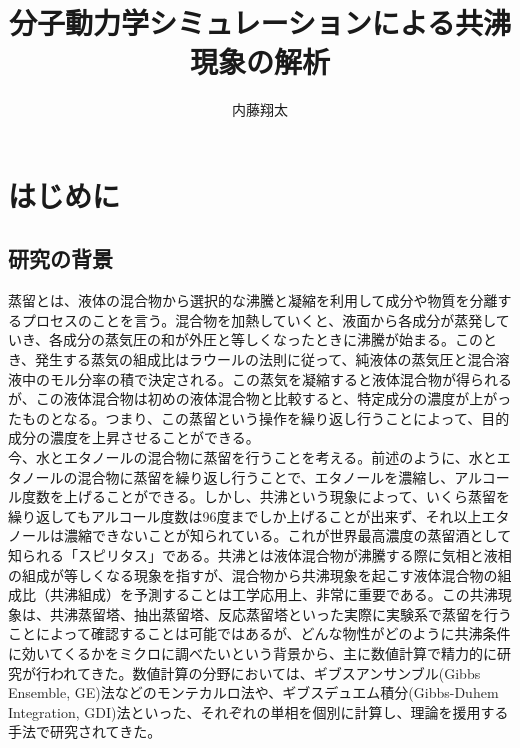 \documentclass[titlepage]{jsreport}
\title{分子動力学シミュレーションによる共沸現象の解析}
\author{内藤翔太}
\begin{document}
\maketitle
{}

\tableofcontents
\pagestyle{plain}
\setcounter{page}{1}

\chapter{はじめに} \label{chap:introduction}


\section{研究の背景} \label{introduction:background}
蒸留とは、液体の混合物から選択的な沸騰と凝縮を利用して成分や物質を分離するプロセスのことを言う。混合物を加熱していくと、液面から各成分が蒸発していき、各成分の蒸気圧の和が外圧と等しくなったときに沸騰が始まる。このとき、発生する蒸気の組成比はラウールの法則に従って、純液体の蒸気圧と混合溶液中のモル分率の積で決定される。この蒸気を凝縮すると液体混合物が得られるが、この液体混合物は初めの液体混合物と比較すると、特定成分の濃度が上がったものとなる。つまり、この蒸留という操作を繰り返し行うことによって、目的成分の濃度を上昇させることができる。\\
今、水とエタノールの混合物に蒸留を行うことを考える。前述のように、水とエタノールの混合物に蒸留を繰り返し行うことで、エタノールを濃縮し、アルコール度数を上げることができる。しかし、共沸という現象によって、いくら蒸留を繰り返してもアルコール度数は96度までしか上げることが出来ず、それ以上エタノールは濃縮できないことが知られている。これが世界最高濃度の蒸留酒として知られる「スピリタス」である。共沸とは液体混合物が沸騰する際に気相と液相の組成が等しくなる現象を指す\cite{azeotrope}が、混合物から共沸現象を起こす液体混合物の組成比（共沸組成）を予測することは工学応用上、非常に重要である。この共沸現象は、共沸蒸留塔\cite{azeotropic-distillation-1,azeotropic-distillation-2}、抽出蒸留塔\cite{extractive-distillation-1,extractive-distillation-2}、反応蒸留塔\cite{reactive-distillation-1,reactive-distillation-2}といった実際に実験系で蒸留を行うことによって確認することは可能ではあるが、どんな物性がどのように共沸条件に効いてくるかをミクロに調べたいという背景から、主に数値計算で精力的に研究が行われてきた。数値計算の分野においては、ギブスアンサンブル(Gibbs Ensemble, GE)法\cite{gibbs-ensemble-1,gibbs-ensemble-2}などのモンテカルロ法や、ギブスデュエム積分(Gibbs-Duhem Integration, GDI)法\cite{gibbs-duhem-integration-1,gibbs-duhem-integration-2}といった、それぞれの単相を個別に計算し、理論を援用する手法で研究されてきた。
\end{document}
